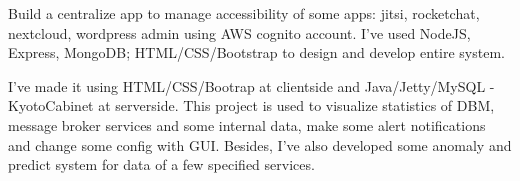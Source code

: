 \documentclass[10pt,a4paper,ragged2e]{altacv}
\begin{document}
\begin{paracol}{2}
\medskip






\nocite{*}

\printbibliography[heading=pubtype,title={\printinfo{\faBook}{Books}},type=book]





\switchcolumn





Build a centralize app to manage accessibility of some apps: jitsi, rocketchat, nextcloud, wordpress admin using AWS cognito account. I've used NodeJS, Express, MongoDB; HTML/CSS/Bootstrap to design and develop entire system.

\divider\smallskip
{}
I've made it using HTML/CSS/Bootrap at clientside and Java/Jetty/MySQL - KyotoCabinet at serverside. This project is used to visualize statistics of DBM, message broker services and some internal data, make some alert notifications and change some config with GUI. Besides, I've also developed some anomaly and predict system for data of a few specified services.


\end{paracol}
\end{document}
